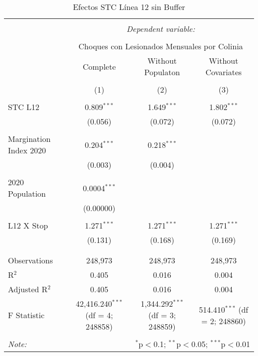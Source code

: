 
\begin{table}[!htbp] \centering 
  \caption{Efectos STC Línea 12 sin Buffer} 
  \label{} 
\begin{tabular}{@{\extracolsep{5pt}}lccc} 
\\[-1.8ex]\hline 
\hline \\[-1.8ex] 
 & \multicolumn{3}{c}{\textit{Dependent variable:}} \\ 
\cline{2-4} 
\\[-1.8ex] & \multicolumn{3}{c}{Choques con Lesionados Mensuales por Colinia} \\ 
 & Complete & Without Populaton & Without Covariates \\ 
\\[-1.8ex] & (1) & (2) & (3)\\ 
\hline \\[-1.8ex] 
 STC L12 & 0.809$^{***}$ & 1.649$^{***}$ & 1.802$^{***}$ \\ 
  & (0.056) & (0.072) & (0.072) \\ 
  & & & \\ 
 Margination Index 2020 & 0.204$^{***}$ & 0.218$^{***}$ &  \\ 
  & (0.003) & (0.004) &  \\ 
  & & & \\ 
 2020 Population & 0.0004$^{***}$ &  &  \\ 
  & (0.00000) &  &  \\ 
  & & & \\ 
 L12 X Stop & 1.271$^{***}$ & 1.271$^{***}$ & 1.271$^{***}$ \\ 
  & (0.131) & (0.168) & (0.169) \\ 
  & & & \\ 
\hline \\[-1.8ex] 
Observations & 248,973 & 248,973 & 248,973 \\ 
R$^{2}$ & 0.405 & 0.016 & 0.004 \\ 
Adjusted R$^{2}$ & 0.405 & 0.016 & 0.004 \\ 
F Statistic & 42,416.240$^{***}$ (df = 4; 248858) & 1,344.292$^{***}$ (df = 3; 248859) & 514.410$^{***}$ (df = 2; 248860) \\ 
\hline 
\hline \\[-1.8ex] 
\textit{Note:}  & \multicolumn{3}{r}{$^{*}$p$<$0.1; $^{**}$p$<$0.05; $^{***}$p$<$0.01} \\ 
\end{tabular} 
\end{table} 
